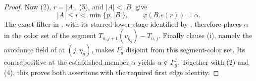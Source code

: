 \begin{proof}
Now (2), $r=|A|$, (5), and $|A|<|B|$ give
\[
 |A|\leq r<\min\{p,|B|\},\qquad \varphi(B.e(r))=\alpha.
\]
The exact filter in , with its starred
lower stage identified by , therefore
places $\alpha$ in the color set of the segment
$T_{n,j+1}(v_{\eta_g})-T_{n,j}$.  Finally clause (i), namely the
avoidance field of  at $(j,\eta_g)$, makes
$\Gamma^j_g$ disjoint from this segment-color set.  Its contrapositive
at the established member $\alpha$ yields
$\alpha\notin\Gamma^j_g$.  Together with (2) and (4), this proves both
assertions with the required first edge identity.
\end{proof}
